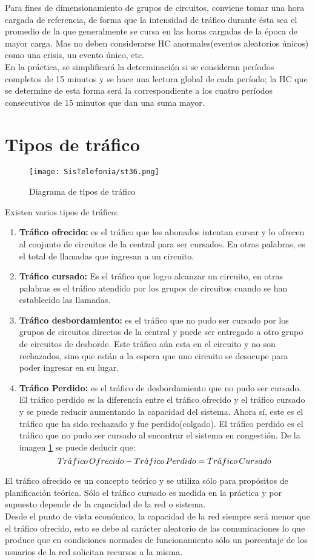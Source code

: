 \documentclass[11pt,fleqn]{book} %
\begin{document}
Para fines de dimensionamiento de grupos de circuitos, conviene tomar una hora cargada de referencia, de forma que la intensidad de tráfico durante ésta sea el promedio de la que generalmente se cursa en las horas cargadas de la época de mayor carga. Mas no deben considerarse HC anormales(eventos aleatorios únicos) como una crisis, un evento único, etc.\\
En la práctica, se simplificará la determinación si se consideran períodos completos de 15 minutos y se hace una lectura global de cada período; la HC que se determine de esta forma será la correspondiente a los cuatro períodos consecutivos de 15 minutos que dan una suma mayor.
\section{Tipos de tráfico}
\begin{figure}[ht]
\centering\texttt{[image: SisTelefonia/st36.png]}
\caption{Diagrama de tipos de tráfico}
\label{fig:TraficoCentral}
\end{figure}
Existen varios tipos de tráfico:
\begin{enumerate}
\item \textbf{Tráfico ofrecido:} es el tráfico que los abonados intentan cursar y lo ofrecen al conjunto de circuitos de la central para ser cursados. En otras palabras, es el total de llamadas que ingresan a un circuito.
\item \textbf{Tráfico cursado:} Es el tráfico que logro alcanzar un circuito, en otras palabras es el tráfico atendido por los grupos de circuitos cuando se han establecido las llamadas.
\item \textbf{Tráfico desbordamiento:} es el tráfico que no pudo ser cursado por los grupos de circuitos directos de la central y puede ser entregado a otro grupo de circuitos de desborde. Este tráfico aún esta en el circuito y no son rechazados, sino que están a la espera que uno circuito se desocupe para poder ingresar en su lugar.
\item \textbf{Tráfico Perdido:} es el tráfico de desbordamiento que no pudo ser cursado. El tráfico perdido es la diferencia entre el tráfico ofrecido y el tráfico cursado y se puede reducir aumentando la capacidad del sistema. Ahora sí, este es el tráfico que ha sido rechazado y fue perdido(colgado). El tráfico perdido es el tráfico que no pudo ser cursado al encontrar el sistema en congestión. De la imagen \ref{fig:TraficoCentral} se puede deducir que:
\begin{equation}
Tr\acute{a}fico\thinspace Ofrecido-Tr\acute{a}fico\thinspace Perdido=Tr\acute{a}fico\thinspace Cursado
\end{equation}
\end{enumerate}
El tráfico ofrecido es un concepto teórico y se utiliza sólo para propósitos de planificación teórica. Sólo el tráfico cursado es medida en la práctica y por supuesto depende de la capacidad de la red o sistema.\\
Desde el punto de vista económico, la capacidad de la red siempre será menor que el tráfico ofrecido, esto se debe al carácter aleatorio de las comunicaciones lo que produce que en condiciones normales de funcionamiento sólo un porcentaje de los usuarios de la red solicitan recursos a la misma.
\end{document}
